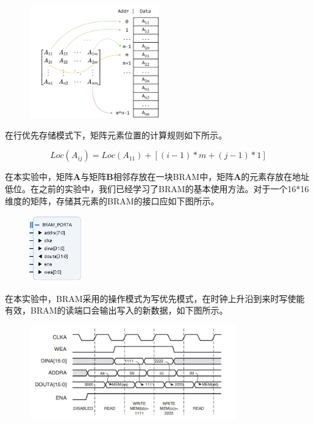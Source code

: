 \documentclass{ctexart}
\begin{document}
\begin{figure}[H]
    \centering
    \includegraphics[width=0.5\textwidth]{lab4/2.png}
\end{figure}

在行优先存储模式下，矩阵元素位置的计算规则如下所示。

$$
Loc(A_{ij})=Loc(A_{11})+[(i-1)*m+(j-1)*1]
$$

在本实验中，矩阵$\boldsymbol{A}$与矩阵$\boldsymbol{B}$相邻存放在一块BRAM中，矩阵$\boldsymbol{A}$的元素存放在地址低位。在之前的实验中，我们已经学习了BRAM的基本使用方法。对于一个16*16维度的矩阵，存储其元素的BRAM的接口应如下图所示。

\begin{figure}[H]
    \centering
    \includegraphics[width=0.2\textwidth]{lab4/3.png}
\end{figure}

在本实验中，BRAM采用的操作模式为写优先模式，在时钟上升沿到来时写使能有效，BRAM的读端口会输出写入的新数据，如下图所示。

\begin{figure}[H]
    \centering
    \includegraphics[width=0.8\textwidth]{lab4/4.jpg}
\end{figure}
\end{document}
